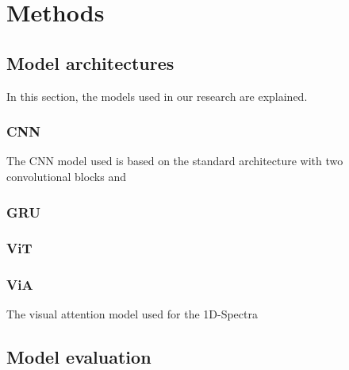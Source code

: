 


\chapter{Methods} %

\label{Chapter3} %







\section{Model architectures}
In this section, the models used in our research are explained.

\subsection{CNN}
The CNN model used is based on the standard architecture with two convolutional blocks and 


\subsection{GRU}


\subsection{ViT}



\subsection{ViA}
The visual attention model used for the 1D-Spectra 



\section{Model evaluation}


